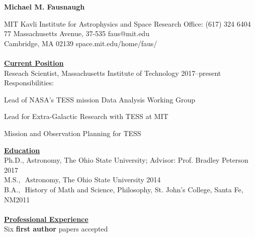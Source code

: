 \documentclass[letterpaper,11pt]{article}
\begin{document}
\begin{center}
\huge\bfseries{Michael M. Fausnaugh}
\end{center}

\noindent MIT Kavli Institute for Astrophysics and Space Research \hfill Office: (617) 324 6404 \\
77 Massachusetts Avenue, 37-535  \hfill faus@mit.edu\\
Cambridge, MA 02139 \hfill space.mit.edu/home/faus/
\\
\\
\underline{\textbf{Current Position}} \\
Reseach Scientist, Massachusetts Institute of Technology \hfill 2017--present\\
Responsibilities: \begin{compactitem}
   \item Lead of NASA's TESS mission Data Analysis Working Group
   \item Lead for Extra-Galactic Research with TESS at MIT
   \item Mission and Observation Planning for TESS
   \end{compactitem}	
\underline{\textbf{Education}}    \\
Ph.D., Astronomy, The Ohio State University;  Advisor:  Prof. Bradley Peterson \hfill 2017\\
M.S.,  \,\,Astronomy, The Ohio State University \hfill 2014\\
B.A., \,\,History of Math and Science, Philosophy, St. John's College, Santa Fe, NM\hfill 2011\\
\\
\noindent\underline{\textbf{Professional Experience}}\\ 
 Six \textbf{first author} papers accepted \\
\end{document}
